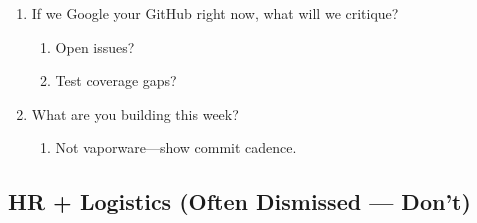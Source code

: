 \documentclass[9pt,a4paper]{article}
\begin{document}
\begin{enumerate}[label=\textbf{Q\arabic*:}, leftmargin=*]
\begin{enumerate}[label=\textit{FU\arabic*:}, leftmargin=2em]
  \end{enumerate}
  \item If we Google your GitHub right now, what will we critique?
  \begin{enumerate}[label=\textit{FU\arabic*:}, leftmargin=2em]
    \item Open issues?
    \item Test coverage gaps?
  \end{enumerate}
  \item What are you building this week?
  \begin{enumerate}[label=\textit{FU\arabic*:}, leftmargin=2em]
    \item Not vaporware---show commit cadence.
  \end{enumerate}
\end{enumerate}
\subsection{HR + Logistics (Often Dismissed --- Don't)}
\end{document}
